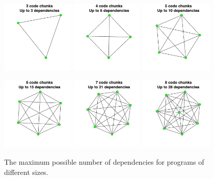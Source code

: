 \begin{figure}[ht]
\centering
\medskip
\includegraphics[width=0.31\textwidth]{dependencies3.png}
\includegraphics[width=0.31\textwidth]{dependencies4.png}
\includegraphics[width=0.31\textwidth]{dependencies5.png}

\includegraphics[width=0.31\textwidth]{dependencies6.png}
\includegraphics[width=0.31\textwidth]{dependencies7.png}
\includegraphics[width=0.31\textwidth]{dependencies8.png}
\caption{The maximum possible number of dependencies for programs of different
sizes.}
\label{fig:dependencyGrowth}
\medskip
\end{figure}

